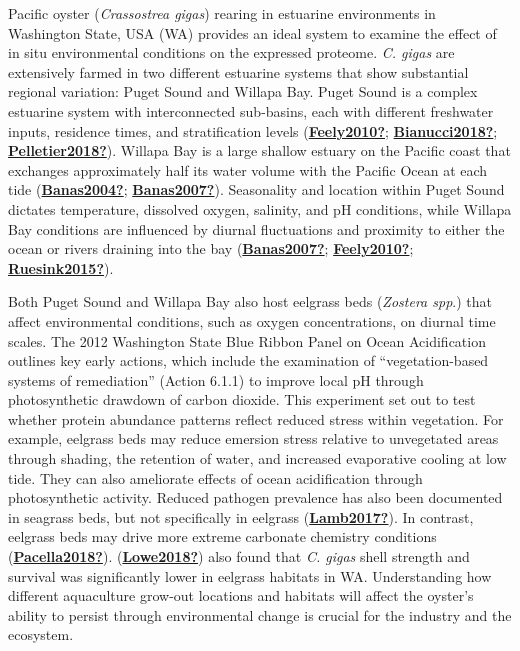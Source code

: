 \documentclass [11pt, proquest] {uwthesis}[2015/03/03]
\begin{document}
Pacific oyster (\emph{Crassostrea gigas}) rearing in estuarine environments in Washington State, USA (WA) provides an ideal system to examine the effect of in situ environmental conditions on the expressed proteome. \emph{C. gigas} are extensively farmed in two different estuarine systems that show substantial regional variation: Puget Sound and Willapa Bay. Puget Sound is a complex estuarine system with interconnected sub-basins, each with different freshwater inputs, residence times, and stratification levels (\protect\hyperlink{ref-Feely2010}{\textbf{Feely2010?}}; \protect\hyperlink{ref-Bianucci2018}{\textbf{Bianucci2018?}}; \protect\hyperlink{ref-Pelletier2018}{\textbf{Pelletier2018?}}). Willapa Bay is a large shallow estuary on the Pacific coast that exchanges approximately half its water volume with the Pacific Ocean at each tide (\protect\hyperlink{ref-Banas2004}{\textbf{Banas2004?}}; \protect\hyperlink{ref-Banas2007}{\textbf{Banas2007?}}). Seasonality and location within Puget Sound dictates temperature, dissolved oxygen, salinity, and pH conditions, while Willapa Bay conditions are influenced by diurnal fluctuations and proximity to either the ocean or rivers draining into the bay (\protect\hyperlink{ref-Banas2007}{\textbf{Banas2007?}}; \protect\hyperlink{ref-Feely2010}{\textbf{Feely2010?}}; \protect\hyperlink{ref-Ruesink2015}{\textbf{Ruesink2015?}}).

Both Puget Sound and Willapa Bay also host eelgrass beds (\emph{Zostera spp}.) that affect environmental conditions, such as oxygen concentrations, on diurnal time scales. The 2012 Washington State Blue Ribbon Panel on Ocean Acidification outlines key early actions, which include the examination of ``vegetation-based systems of remediation'' (Action 6.1.1) to improve local pH through photosynthetic drawdown of carbon dioxide. This experiment set out to test whether protein abundance patterns reflect reduced stress within vegetation. For example, eelgrass beds may reduce emersion stress relative to unvegetated areas through shading, the retention of water, and increased evaporative cooling at low tide. They can also ameliorate effects of ocean acidification through photosynthetic activity. Reduced pathogen prevalence has also been documented in seagrass beds, but not specifically in eelgrass (\protect\hyperlink{ref-Lamb2017}{\textbf{Lamb2017?}}). In contrast, eelgrass beds may drive more extreme carbonate chemistry conditions (\protect\hyperlink{ref-Pacella2018}{\textbf{Pacella2018?}}). (\protect\hyperlink{ref-Lowe2018}{\textbf{Lowe2018?}}) also found that \emph{C. gigas} shell strength and survival was significantly lower in eelgrass habitats in WA. Understanding how different aquaculture grow-out locations and habitats will affect the oyster's ability to persist through environmental change is crucial for the industry and the ecosystem.
\end{document}
